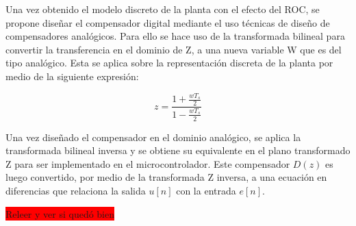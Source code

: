Una vez obtenido el modelo discreto de la planta con el efecto del ROC, se propone diseñar el compensador digital mediante el uso técnicas de diseño de compensadores analógicos. Para ello se hace uso de la transformada bilineal para convertir la transferencia en el dominio de Z, a una nueva variable W que es del tipo analógico. Esta se aplica sobre la representación discreta de la planta por medio de la siguiente expresión:


\begin{equation*}
	z=\frac{1+\frac{wT_s}{2}}{1-\frac{wT_s}{2}}
\end{equation*}



Una vez diseñado el compensador en el dominio analógico, se aplica la transformada bilineal inversa y se obtiene su equivalente en el plano transformado Z para ser implementado en el microcontrolador. Este compensador $D(z)$ es luego convertido, por medio de la transformada Z inversa, a una ecuación en diferencias que relaciona la salida $u[n]$ con la entrada $e[n]$. 


\colorbox{red}{Releer y ver si quedó bien}

%
%
%
%
%




